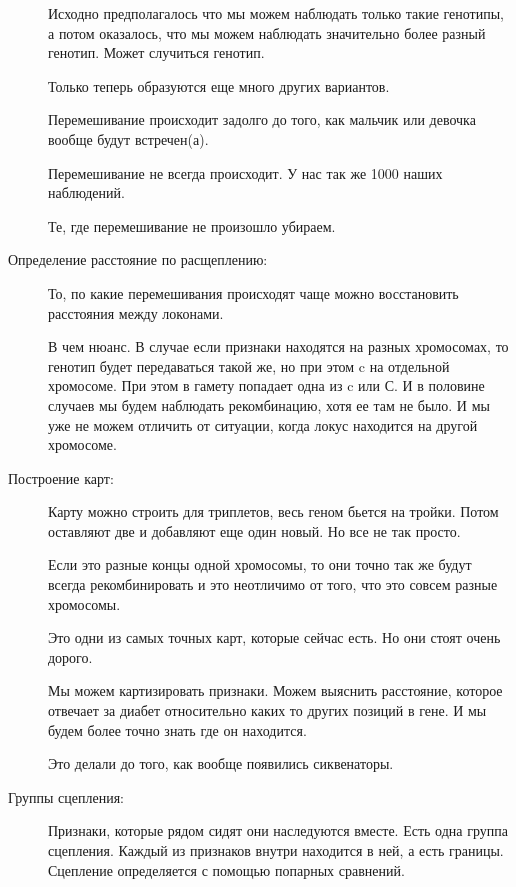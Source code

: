\begin{description}
Исходно предполагалось что мы можем наблюдать только такие генотипы, а
потом оказалось, что мы можем наблюдать значительно 
более разный генотип. Может случиться генотип. 

Только теперь образуются еще много других вариантов. 

\TODO %

Перемешивание происходит задолго до того, 
как мальчик или девочка вообще будут встречен(а). 

Перемешивание не всегда происходит. У нас 
так же 1000 наших наблюдений.

Те, где перемешивание не произошло убираем. 

\item[Определение расстояние по расщеплению:]

То, по какие перемешивания происходят чаще 
можно восстановить расстояния между локонами. 

\TODO %

В чем нюанс. В случае если признаки находятся на
разных хромосомах, то генотип будет передаваться такой же,
но при этом c на отдельной хромосоме. При этом в гамету
попадает одна из c или С. И в половине
случаев мы будем наблюдать рекомбинацию,
хотя ее там не было. И мы уже не можем
отличить от ситуации, когда локус находится на другой хромосоме.


\item[Построение карт:]
Карту можно строить для триплетов, весь геном
бьется на тройки. Потом оставляют две и добавляют еще
один новый. Но все не так просто.

Если это разные концы одной хромосомы, то они точно так же
будут всегда рекомбинировать и это неотличимо от
того, что это совсем разные хромосомы.

Это одни из самых точных карт, которые сейчас есть. Но
они стоят очень дорого.

Мы можем картизировать признаки. Можем выяснить расстояние, которое
отвечает за диабет относительно каких то других позиций в гене.
И мы будем более точно знать где он находится.

Это делали до того, как вообще появились сиквенаторы.
 
\item[Группы сцепления:] Признаки, которые рядом сидят 
они наследуются вместе. Есть одна группа сцепления. 
Каждый из признаков внутри находится в ней, а есть 
границы. Сцепление определяется с помощью попарных сравнений. 


\end{description}
